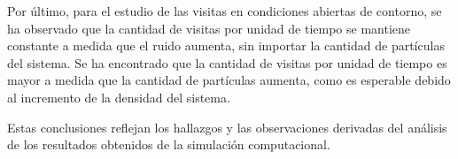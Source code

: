 \documentclass[11pt, a4paper]{article}
\begin{document}
        Por último, para el estudio de las visitas en condiciones abiertas de contorno, se ha observado que la cantidad
        de visitas por unidad de tiempo se mantiene constante a medida que el ruido aumenta, sin importar la cantidad de
        partículas del sistema.
        Se ha encontrado que la cantidad de visitas por unidad de tiempo es mayor a medida que la cantidad de partículas
        aumenta, como es esperable debido al incremento de la densidad del sistema.

        Estas conclusiones reflejan los hallazgos y las observaciones derivadas del análisis de los resultados
        obtenidos de la simulación computacional.
\end{document}
